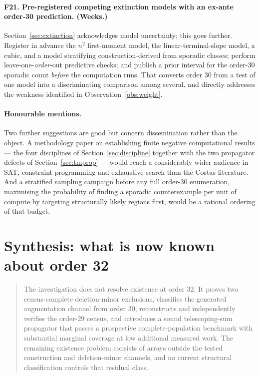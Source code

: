\documentclass[11pt,a4paper]{article}
\theoremstyle{definition}
\begin{document}
\paragraph{F21. Pre-registered competing extinction models with an ex-ante
order-30 prediction. (Weeks.)} Section~\ref{sec:extinction} acknowledges model
uncertainty; this goes further. Register in advance the $n^2$ first-moment model,
the linear-terminal-slope model, a cubic, and a model stratifying
construction-derived from sporadic classes; perform leave-one-\emph{order}-out
predictive checks; and publish a prior interval for the order-30 sporadic count
\emph{before} the computation runs. That converts order 30 from a test of one
model into a discriminating comparison among several, and directly addresses the
weakness identified in Observation~\ref{obs:weight}.

\paragraph{Honourable mentions.} Two further suggestions are good but concern
dissemination rather than the object. A methodology paper on establishing finite
negative computational results --- the four disciplines of
Section~\ref{sec:discipline} together with the two propagator defects of
Section~\ref{sec:tmprop} --- would reach a considerably wider audience in SAT,
constraint programming and exhaustive search than the Costas literature. And a
stratified sampling campaign before any full order-30 enumeration, maximising the
probability of finding a sporadic counterexample per unit of compute by targeting
structurally likely regions first, would be a rational ordering of that budget.

\section{Synthesis: what is now known about order 32}

\begin{quote}
The investigation does not resolve existence at order 32. It proves two
census-complete deletion-minor exclusions, classifies the generated augmentation
channel from order 30, reconstructs and independently verifies the order-29
census, and introduces a sound telescoping-sum propagator that passes a
prospective complete-population benchmark with substantial marginal coverage at
low additional measured work. The remaining existence problem consists of arrays
outside the tested construction and deletion-minor channels, and no current
structural classification controls that residual class.
\end{quote}
\end{document}
